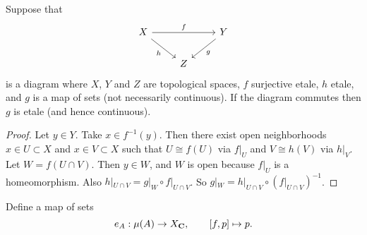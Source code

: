 \begin{lemma}
\label{lem:2-out-of-3 property for etales}
Suppose that
\[ \begin{tikzcd}
X \arrow{rr}{f} \arrow[swap]{dr}{h} & & Y \arrow{dl}{g} \\
& Z &
\end{tikzcd} \]
is a diagram where $X$, $Y$ and $Z$ are topological spaces, $f$ surjective etale, $h$ etale, and $g$ is a map of sets (not necessarily continuous). If the diagram commutes then $g$ is etale (and hence continuous).
\end{lemma}
\begin{proof}
Let $y \in Y$. Take $x \in f^{-1}(y)$. Then there exist open neighborhoods $x \in U \subset X$ and $x \in V \subset X$ such that $U \cong f(U)$ via $f|_U$ and $V \cong h(V)$ via $h|_V$. Let $W = f(U \cap V)$. Then $y \in W$, and $W$ is open because $f|_U$ is a homeomorphism. Also $h|_{U \cap V} = g|_{W} \circ f|_{U \cap V}$. So $g|_{W} = h|_{U \cap V} \circ \left(f|_{U \cap V}\right)^{-1}$.
\end{proof}


Define a map of sets
\[ e_A : \operatorname{\mu}(A) \to X_{\mathbf{C}}, \qquad [f,p] \mapsto p. \]

